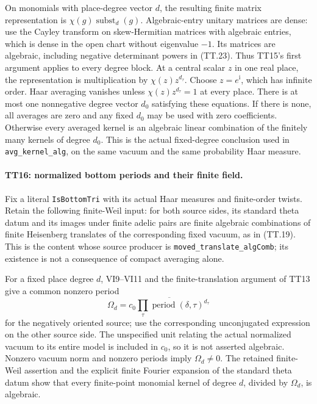 On monomials with place-degree vector $d$, the resulting finite
matrix representation is $\chi(g)\operatorname{subst}_d(g)$.
Algebraic-entry unitary matrices are dense: use the Cayley
transform on skew-Hermitian matrices with algebraic entries,
which is dense in the open chart without eigenvalue $-1$.
Its matrices are algebraic, including negative determinant
powers in (TT.23). Thus TT15's first argument applies to every
degree block. At a central scalar $z$ in one real place, the
representation is multiplication by $\chi(z)z^{d_\tau}$.
Choose $z=e^{\mathrm i}$, which has infinite order. Haar
averaging vanishes unless
$\chi(z)z^{d_\tau}=1$ at every place. There is at most one
nonnegative degree vector $d_0$ satisfying these equations. If
there is none, all averages are zero and any fixed $d_0$ may be
used with zero coefficients. Otherwise every averaged kernel is
an algebraic linear combination of the finitely many kernels of
degree $d_0$. This is the actual fixed-degree conclusion used in
\texttt{avg\_kernel\_alg}, on the same vacuum and the same
probability Haar measure.

\paragraph{TT16: normalized bottom periods and their finite field.}
Fix a literal \texttt{IsBottomTri} with its actual Haar measures
and finite-order twists. Retain the following finite-Weil input:
for both source sides, its standard theta datum and its images
under finite adelic pairs are finite algebraic combinations of
finite Heisenberg translates of the corresponding fixed vacuum,
as in (TT.19). This is the content whose source producer is
\texttt{moved\_translate\_algComb}; its existence is not a
consequence of compact averaging alone.

For a fixed place degree $d$, VI9--VI11 and the finite-translation
argument of TT13 give a common nonzero period
\[
       \Omega_d=\overline{c_0\prod_\tau
                      \operatorname{period}(\delta,\tau)^{d_\tau}}
                                                                  \tag{TT.24}
\]
for the negatively oriented source; use the corresponding
unconjugated expression on the other source side. The unspecified
unit relating the actual normalized vacuum to its entire model
is included in $c_0$, so it is not asserted algebraic. Nonzero
vacuum norm and nonzero periods imply $\Omega_d\ne0$.
The retained finite-Weil assertion and the explicit finite
Fourier expansion of the standard theta datum show that every
finite-point monomial kernel of degree $d$, divided by
$\Omega_d$, is algebraic.

